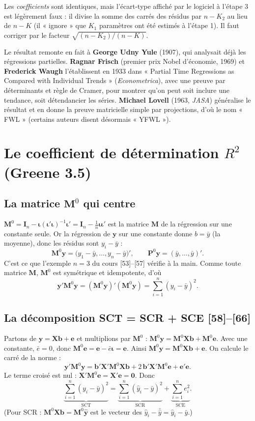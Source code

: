 \documentclass[11pt,a4paper]{article}
\newcommand{\vy}{\mathbf{y}}
\newcommand{\vX}{\mathbf{X}}
\newcommand{\ve}{\mathbf{e}}
\newcommand{\vb}{\mathbf{b}}
\newcommand{\vi}{\bm{\iota}}
\newcommand{\Mm}{\mathbf{M}}
\newcommand{\Pm}{\mathbf{P}}
\newcommand{\I}{\mathbf{I}}
\newcommand{\sumi}{\sum_{i=1}^{n}}
\begin{document}
\begin{attention}
Les \emph{coefficients} sont identiques, mais l'écart-type affiché par le logiciel à l'étape 3 est légèrement faux : il divise la somme des carrés des résidus par $n-K_2$ au lieu de $n-K$ (il « ignore » que $K_1$ paramètres ont été estimés à l'étape 1). Il faut corriger par le facteur $\sqrt{(n-K_2)/(n-K)}$.
\end{attention}

\begin{histoire}
Le résultat remonte en fait à \textbf{George Udny Yule} (1907), qui analysait déjà les régressions partielles. \textbf{Ragnar Frisch} (premier prix Nobel d'économie, 1969) et \textbf{Frederick Waugh} l'établissent en 1933 dans « Partial Time Regressions as Compared with Individual Trends » (\emph{Econometrica}), avec une preuve par déterminants et règle de Cramer, pour montrer qu'on peut soit inclure une tendance, soit détendancier les séries. \textbf{Michael Lovell} (1963, \emph{JASA}) généralise le résultat et en donne la preuve matricielle simple par projections, d'où le nom « FWL » (certains auteurs disent désormais « YFWL »).
\end{histoire}

\section{Le coefficient de détermination $R^2$ (Greene 3.5)}

\subsection{La matrice $\Mm^0$ qui centre}
$\Mm^0=\I_n-\vi(\vi'\vi)^{-1}\vi'=\I_n-\frac1n\vi\vi'$ est la matrice $\Mm$ de la régression sur une constante seule. Or la régression de $\vy$ sur une constante donne $b=\bar y$ (la moyenne), donc les résidus sont $y_i-\bar y$ :
\[
\Mm^0\vy=\big(y_1-\bar y,\dots,y_n-\bar y\big)' ,\qquad \Pm^0\vy=(\bar y,\dots,\bar y)'.
\]
C'est ce que l'exemple $n=3$ du cours [53]--[57] vérifie à la main. Comme toute matrice $\Mm$, $\Mm^0$ est symétrique et idempotente, d'où
\[
\vy'\Mm^0\vy=(\Mm^0\vy)'(\Mm^0\vy)=\sumi(y_i-\bar y)^2 .
\]

\subsection{La décomposition SCT = SCR + SCE [58]--[66]}
\begin{detail}
Partons de $\vy=\vX\vb+\ve$ et multiplions par $\Mm^0$ : $\Mm^0\vy=\Mm^0\vX\vb+\Mm^0\ve$.
Avec une constante, $\bar e=0$, donc $\Mm^0\ve=\ve-\bar e\vi=\ve$. Ainsi $\Mm^0\vy=\Mm^0\vX\vb+\ve$. On calcule le carré de la norme :
\[
\vy'\Mm^0\vy=\vb'\vX'\Mm^0\vX\vb+2\,\vb'\vX'\Mm^0\ve+\ve'\ve .
\]
Le terme croisé est nul : $\vX'\Mm^0\ve=\vX'\ve=\mathbf 0$. Donc
\[
\underbrace{\sumi(y_i-\bar y)^2}_{\text{SCT}}=\underbrace{\sumi(\hat y_i-\bar y)^2}_{\text{SCR}}+\underbrace{\sumi e_i^2}_{\text{SCE}} .
\]
(Pour SCR : $\Mm^0\vX\vb=\Mm^0\hat{\vy}$ est le vecteur des $\hat y_i-\bar{\hat y}=\hat y_i-\bar y$.)
\end{detail}
\end{document}
